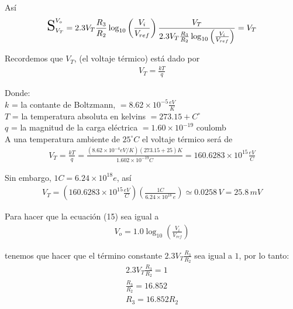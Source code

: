 \documentclass[12pt,a4paper]{article}
\begin{document}
	Así
	\begin{align}
		\scalebox{1.8}{S}_{V_T}^{V_o} = 2.3V_T \frac{R_3}{R_2}\log_{10}\left( \frac{V_i}{V_{ref}} \right) \frac{V_T}{ 2.3V_T \frac{R_3}{R_2} \log_{10} \left( \frac{V_i}{V_{ref}} \right) } = V_T
	\end{align}

	Recordemos que $V_T$, (el voltaje térmico) está dado por
	\begin{align}
		V_T = \frac{kT}{q}
	\end{align}
	
	\newpage
	Donde:\\
	$k$ = la contante de Boltzmann, $ = 8.62 \times 10^{-5} \frac{eV}{K}$\\
	$T$ =  la temperatura absoluta en kelvins $=273.15 + C^{\circ} $\\
	$q$ = la magnitud de la carga eléctrica $= 1.60 \times 10^{-19}$ coulomb \\
	
	A una temperatura ambiente de $25^{\circ}C$ el voltaje térmico será de
	\begin{align}
		V_T = \frac{kT}{q} = \frac{(8.62 \times 10^{-4} eV/K)(273.15 + 25)K}{1.602 \times 10^{-19} C} = 160.6283 \times 10^{15} \frac{eV}{C}
	\end{align}

	Sin embargo, $1C = 6.24\times 10^{18}e$, así
	\begin{align}
		V_T = \left( 160.6283 \times 10^{15} \frac{eV}{C} \right) \left( \frac{1C}{6.24 \times 10^{18}\,e} \right) \simeq 0.0258 \, V = 25.8 \,mV\nonumber
	\end{align}

	Para hacer que la ecuación (15) sea igual a
	\begin{align}
		V_o = 1.0 \log_{10} \left( \frac{V_i}{V_{ref}} \right)\nonumber
	\end{align}
	
	tenemos que hacer que el término constante $2.3V_T \frac{R_3}{R_2}$ sea igual a $1$, por lo tanto:
	\begin{align}
		2.3V_T \frac{R_3}{R_2} = 1\nonumber\\
		\frac{R_3}{R_2} = 16.852\nonumber\\
		R_3 = 16.852R_2
	\end{align}
	
\end{document}
